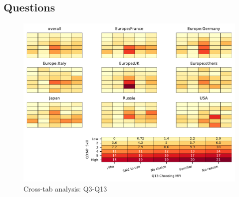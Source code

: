 
\subsection{Questions}


\begin{figure}
\begin{center}
\includegraphics[width=12cm]{../pdfs/Q3-Q13.pdf}
\caption{Cross-tab analysis: Q3-Q13}
\label{fig:Q3-Q13}
\end{center}
\end{figure}
